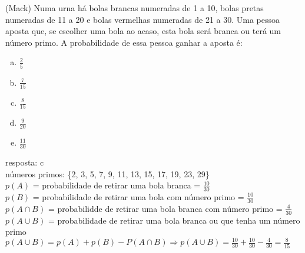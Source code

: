 \begin{ex}
  (Mack) Numa urna há bolas brancas numeradas de 1 a 10, bolas pretas numeradas de 11 a 20 e bolas vermelhas numeradas de 21 a 30. Uma pessoa aposta que, se escolher uma bola ao acaso, esta bola será branca ou terá um número primo. A probabilidade de essa pessoa ganhar a aposta é:
   \begin{enumerate} [(a)]
       \item $\frac{2}{5}$
       \item $\frac{7}{15}$
       \item $\frac{8}{15}$
       \item $\frac{9}{20}$
       \item $\frac{11}{30}$
   \end{enumerate}
    \begin{sol}
    resposta: c \\
    números primos: \{2, 3, 5, 7, 9, 11, 13, 15, 17, 19, 23, 29\}\\
    $p(A)$ = probabilidade de retirar uma bola branca = $\frac{10}{30}$ \\
    $p(B)$ = probabilidade de retirar uma bola com número primo = $\frac{10}{30}$ \\
    $p(A\cap B)$ = probabilidde de retirar uma bola branca com número primo = $\frac{4}{30}$ \\
    $p(A\cup B)$ = probabilidade de retirar uma bola branca ou que tenha um número primo\\
    $p(A\cup B)= p(A) + p(B) - P(A\cap B) \Longrightarrow  p(A\cup B)=\frac{10}{30}+\frac{10}{30}-\frac{4}{30}=\frac{8}{15}$
    \end{sol}
\end{ex}